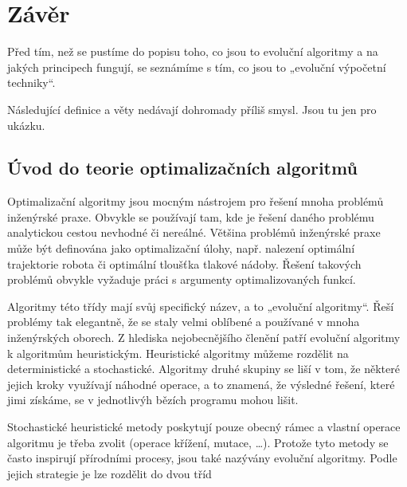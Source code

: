 \documentclass[bc,male,java,dept460]{diploma}		%
\begin{document}
\section{Závěr}
Před tím, než se pustíme do popisu toho, co jsou to evoluční algoritmy a na jakých principech fungují, se seznámíme s tím, co jsou to „evoluční výpočetní techniky“.


\begin{remark}
Následující definice a věty nedávají dohromady příliš smysl. Jsou tu jen pro ukázku.
\end{remark}

\subsection{Úvod do teorie optimalizačních algoritmů}
\par
Optimalizační algoritmy jsou mocným nástrojem pro řešení mnoha problémů inženýrské praxe. Obvykle se používají tam, kde je řešení daného problému analytickou cestou nevhodné či nereálné.
Většina problémů inženýrské praxe může být definována jako optimalizační úlohy, např. nalezení optimální trajektorie robota či optimální tloušťka tlakové nádoby. Řešení takových problémů obvykle vyžaduje práci s argumenty optimalizovaných funkcí.
\par
Algoritmy této třídy mají svůj specifický název, a to „evoluční algoritmy“. Řeší problémy tak elegantně, že se staly velmi oblíbené a používané v mnoha inženýrských oborech. Z hlediska nejobecnějšího členění patří evoluční algoritmy k algoritmům heuristickým. Heuristické algoritmy můžeme rozdělit na deterministické a stochastické. Algoritmy druhé skupiny se liší v tom, že některé jejich kroky využívají náhodné operace, a to znamená, že výsledné řešení, které jimi získáme, se v jednotlivýh bězích programu  mohou lišit.
\par
Stochastické heuristické metody poskytují pouze obecný rámec a vlastní operace algoritmu je třeba zvolit (operace křížení, mutace, …). Protože tyto metody se často inspirují přírodními procesy, jsou také nazývány evoluční algoritmy. Podle jejich strategie je lze rozdělit do dvou tříd
\end{document}
